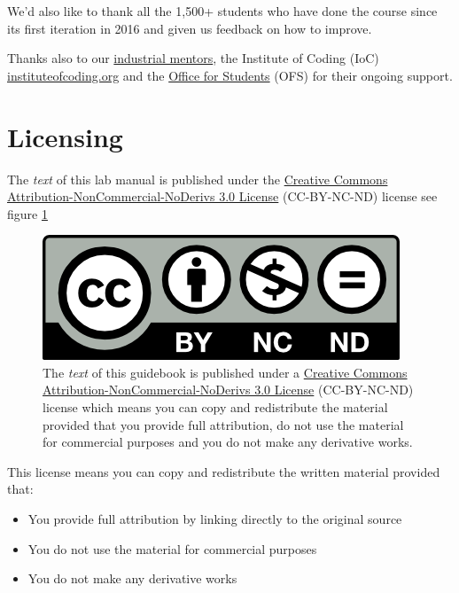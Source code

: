 \documentclass[
]{book}
\providecommand{\tightlist}{%
  \setlength{\itemsep}{0pt}\setlength{\parskip}{0pt}}
\begin{document}
We'd also like to thank all the 1,500+ students who have done the course since its first iteration in 2016 and given us feedback on how to improve.

Thanks also to our \href{https://www.cs.manchester.ac.uk/connect/business-engagement/industrial-mentoring/}{industrial mentors}, the Institute of Coding (IoC) \href{https://instituteofcoding.org/}{instituteofcoding.org} and the \href{https://www.officeforstudents.org.uk/}{Office for Students} (OFS) for their ongoing support.

\hypertarget{license}{%
\section{Licensing}\label{license}}

The \emph{text} of this lab manual is published under the \href{https://creativecommons.org/licenses/by-nc-nd/3.0/}{Creative Commons Attribution-NonCommercial-NoDerivs 3.0 License} (CC-BY-NC-ND) license see figure \ref{fig:cc-by-nc-nd-fig}

\begin{figure}

{\centering \includegraphics[width=1\linewidth]{images/by-nc-nd} 

}

\caption{The \emph{text} of this guidebook is published under a \href{https://creativecommons.org/licenses/by-nc-nd/3.0/}{Creative Commons Attribution-NonCommercial-NoDerivs 3.0 License} (CC-BY-NC-ND) license which means you can copy and redistribute the material provided that you provide full attribution, do not use the material for commercial purposes and you do not make any derivative works.}\label{fig:cc-by-nc-nd-fig}
\end{figure}



This license means you can copy and redistribute the written material provided that:

\begin{itemize}
\tightlist
\item
  You provide full attribution by linking directly to the original source
\item
  You do not use the material for commercial purposes
\item
  You do not make any derivative works
\end{itemize}
\end{document}
